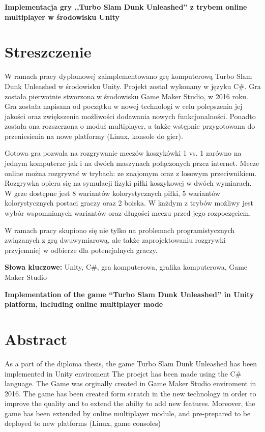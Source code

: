 \newpage
\begin{center}
\large \bf
Implementacja gry ,,Turbo Slam Dunk Unleashed'' z trybem online multiplayer w środowisku Unity
\end{center}

\section*{Streszczenie}
W ramach pracy dyplomowej zaimplementowano grę komputerową Turbo Slam Dunk Unleashed w środowisku Unity. Projekt został wykonany w języku C\#. Gra została pierwotnie stworzona w środowisku Game Maker Studio, w 2016 roku. Gra została napisana od początku w nowej technologi w celu polepszenia jej jakości oraz zwiększenia możliwości dodawania nowych funkcjonalności. Ponadto została ona rozszerzona o moduł multiplayer, a także wstępnie przygotowana do przeniesienia na nowe platformy (Linux, konsole do gier).

Gotowa gra pozwala na rozgrywanie meczów koszykówki 1 vs. 1 zarówno na jednym komputerze jak i na dwóch maszynach połączonych przez internet. Mecze online można rozgrywać w trybach: ze znajomym oraz z losowym przeciwnikiem. Rozgrywka opiera się na symulacji fizyki piłki koszykowej w dwóch wymiarach. W grze dostępne jest 8 wariantów kolorystycznych piłki, 5 wariantów kolorystycznych postaci graczy oraz 2 boiska. W każdym z trybów możliwy jest wybór wspomnianych wariantów oraz długości meczu przed jego rozpoczęciem.

W ramach pracy skupiono się nie tylko na problemach programistycznych związanych z grą dwuwymiarową, ale także zaprojektowaniu rozgrywki przyjemniej w odbierze dla potencjalnych graczy.

\bigskip
{\noindent\bf Słowa kluczowe:} Unity, C\#, gra komputerowa, grafika komputerowa, Game Maker Studio

\vskip 2cm



\newpage
\begin{center}
\large \bf
Implementation of the game ``Turbo Slam Dunk Unleashed'' in Unity platform, including online multiplayer mode 
\end{center}

\section*{Abstract}
As a part of the diploma thesis, the game Turbo Slam Dunk Unleashed has been implemented in Unity enviroment The proejct has been made using the C\# language. The Game was orginally created in Game Maker Studio enviroment in 2016. The game has been created form scratch in the new technology in order to improve the quality and to extend the abilty to add new features. Moreover, the game has been extended by online multiplayer module, and pre-prepared to be deployed to new platforms (Linux, game consoles)

